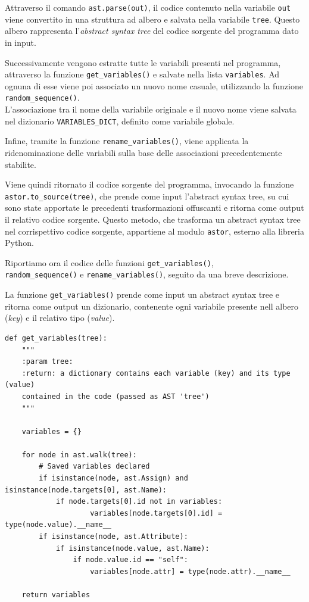 \documentclass[a4paper,oneside,openright,titlepage,10pt,footinclude,headinclude]{scrbook}
\begin{document}
Attraverso il comando \texttt{ast.parse(out)}, il codice contenuto nella variabile \texttt{out} viene convertito in una struttura ad albero e salvata nella variabile \texttt{tree}. Questo albero rappresenta l'\emph{abstract syntax tree} del codice sorgente del programma dato in input.

Successivamente vengono estratte tutte le variabili presenti nel programma, attraverso la funzione \texttt{get\_variables()} e salvate nella lista \texttt{variables}. Ad ognuna di esse viene poi associato un nuovo nome casuale, utilizzando la funzione \texttt{random\_sequence()}.\\
L'associazione tra il nome della variabile originale e il nuovo nome viene salvata nel dizionario \texttt{VARIABLES\_DICT}, definito come variabile globale.

Infine, tramite la funzione \texttt{rename\_variables()}, viene applicata la ridenominazione delle variabili sulla base delle associazioni precedentemente stabilite.

Viene quindi ritornato il codice sorgente del programma, invocando la funzione  \texttt{astor.to\_source(tree)}, che prende come input l'abstract syntax tree, su cui sono state apportate le precedenti trasformazioni offuscanti e ritorna come output il relativo codice sorgente. Questo metodo, che trasforma un abstract syntax tree nel corrispettivo codice sorgente, appartiene al modulo \texttt{astor}, esterno alla libreria Python.\bigskip


Riportiamo ora il codice delle funzioni \texttt{get\_variables()},\\ \texttt{random\_sequence()} e \texttt{rename\_variables()}, seguito da una breve descrizione.\smallskip

La funzione \texttt{get\_variables()} prende come input un abstract syntax tree e ritorna come output un dizionario, contenente ogni variabile presente nell albero (\emph{key}) e il relativo tipo (\emph{value}).
\begin{graybox}[innerleftmargin=2,]
\begin{lstlisting}
def get_variables(tree):
    """
    :param tree:
    :return: a dictionary contains each variable (key) and its type (value) 
    contained in the code (passed as AST 'tree')
    """

    variables = {}

    for node in ast.walk(tree):
        # Saved variables declared
        if isinstance(node, ast.Assign) and isinstance(node.targets[0], ast.Name):
            if node.targets[0].id not in variables:
                    variables[node.targets[0].id] = type(node.value).__name__
        if isinstance(node, ast.Attribute):
            if isinstance(node.value, ast.Name):
                if node.value.id == "self":
                    variables[node.attr] = type(node.attr).__name__
        
    return variables
\end{lstlisting}
\end{graybox}
\end{document}
